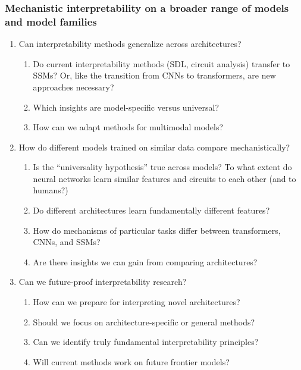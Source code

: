 \subsubsection{Mechanistic interpretability on a broader range of models and model families}
\begin{enumerate}
    \item Can interpretability methods generalize across architectures?
    \begin{enumerate}[label=\alph*.]
        \item Do current interpretability methods (SDL, circuit analysis) transfer to SSMs? Or, like the transition from CNNs to transformers, are new approaches necessary?
        \item Which insights are model-specific versus universal?
        \item How can we adapt methods for multimodal models?
    \end{enumerate}
    
    \item How do different models trained on similar data compare mechanistically?
    \begin{enumerate}[label=\alph*.]
        \item Is the “universality hypothesis” true across models? To what extent do neural networks learn similar features and circuits to each other (and to humans?)
        \item Do different architectures learn fundamentally different features?
        \item How do mechanisms of particular tasks differ between transformers, CNNs, and SSMs?
        \item Are there insights we can gain from comparing architectures?
    \end{enumerate}
    
    \item Can we future-proof interpretability research?
    \begin{enumerate}[label=\alph*.]
        \item How can we prepare for interpreting novel architectures?
        \item Should we focus on architecture-specific or general methods?
        \item Can we identify truly fundamental interpretability principles?
        \item Will current methods work on future frontier models?
    \end{enumerate}
\end{enumerate}

